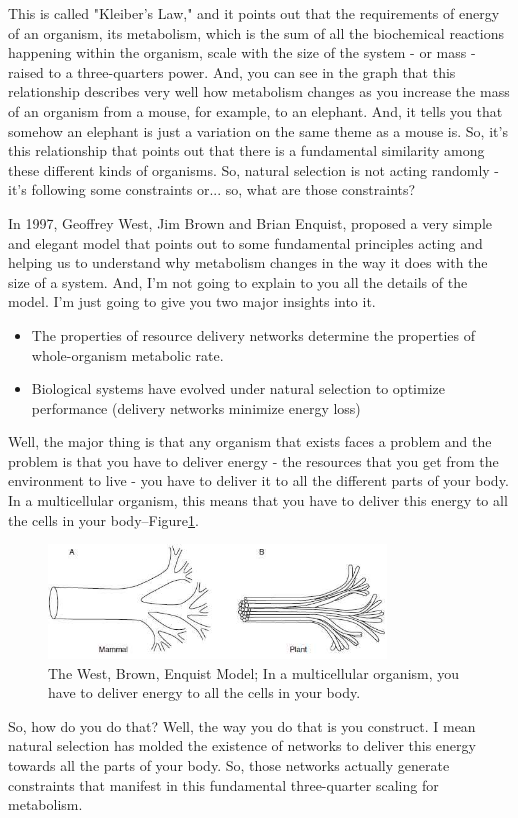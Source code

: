 \documentclass[]{article}
\begin{document}
This is called "Kleiber's Law,"
and it points out that
the requirements of energy
of an organism, its metabolism,
which is the sum of
all the biochemical reactions
happening within the organism,
scale with the size of the system -
or mass -
raised to a three-quarters power.
And, you can see in the graph that
this relationship describes very well
how metabolism changes
as you increase the mass of an organism
from a mouse, for example,
to an elephant.
And, it tells you that somehow
an elephant is just a variation
on the same theme as a mouse is.
So, it's this relationship that points out
that there is a fundamental similarity
among these different kinds of organisms.
So, natural selection
is not acting randomly -
it's following some constraints or...
so, what are those constraints?

In 1997, Geoffrey West, Jim Brown and Brian Enquist, proposed a very simple and elegant model that points out to some fundamental principles acting and helping us to understand why metabolism changes in the way it does with the size of a system.
And, I'm not going to explain to you
all the details of the model.
I'm just going to give you
two major insights into it.
\begin{itemize}
	\item The properties of resource delivery networks determine
	the properties of whole-organism metabolic rate.
	\item  Biological systems have evolved under natural
	selection to optimize performance (delivery networks
	minimize energy loss)
\end{itemize}

Well, the major thing is that
any organism that exists faces a problem
and the problem is that
you have to deliver energy -
the resources that you get
from the environment to live -
you have to deliver it to
all the different parts of your body.
In a multicellular organism,
this means that you have to deliver
this energy to all the cells in your body--Figure\ref{fig:capillaries}.
\begin{figure}[H]
	\caption[The West, Brown, Enquist Model]{The West, Brown, Enquist Model; In a multicellular organism, you have to deliver energy to all the cells in your body.\cite{west1997general}}\label{fig:capillaries}
	\includegraphics[width=0.8\textwidth]{capillaries}
\end{figure}
So, how do you do that?
Well, the way you do that is
you construct.
I mean natural selection has molded
the existence of networks
to deliver this energy towards
all the parts of your body.
So, those networks
actually generate constraints
that manifest in this fundamental
three-quarter scaling for metabolism.
\end{document}
